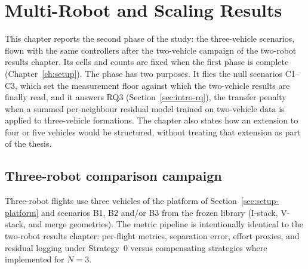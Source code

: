 %
%
%

\chapter{Multi-Robot and Scaling Results}
\label{ch:results3}

This chapter reports the second phase of the study: the three-vehicle scenarios, flown with the
same controllers after the two-vehicle campaign of the two-robot results chapter. Its cells and
counts are fixed when the first phase is complete (Chapter~\ref{ch:setup}). The phase has two
purposes. It flies the null scenarios C1--C3, which set the measurement floor against which the
two-vehicle results are finally read, and it answers RQ3 (Section~\ref{sec:intro-rq}), the transfer
penalty when a summed per-neighbour residual model trained on two-vehicle data is applied to
three-vehicle formations. The chapter also states how an extension to four or five vehicles would be
structured, without treating that extension as part of the thesis.

\section{Three-robot comparison campaign}
\label{sec:res3-campaign}

Three-robot flights use three vehicles of the platform of Section~\ref{sec:setup-platform} and scenarios B1, B2 and/or B3 from the frozen library (I-stack, V-stack, and merge geometries). The metric pipeline is
intentionally identical to the two-robot results chapter: per-flight metrics, separation error, effort
proxies, and residual logging under Strategy~0 versus compensating strategies where implemented
for $N=3$.

